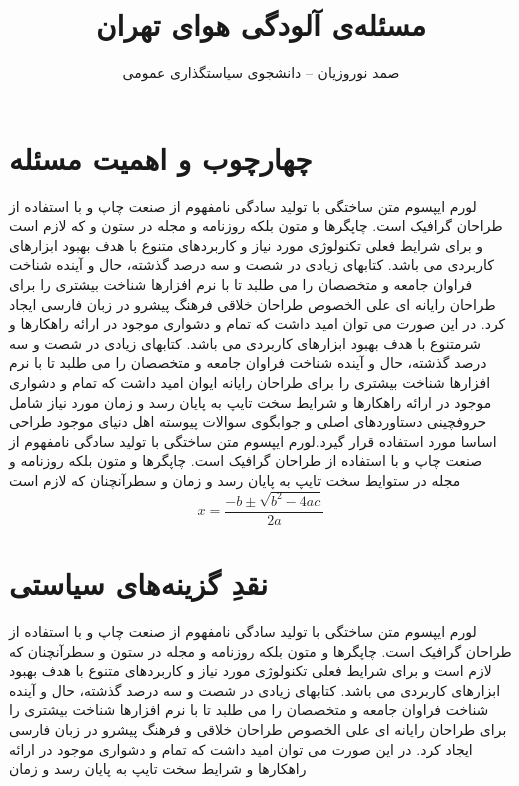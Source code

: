 \documentclass{atu}
\title{مسئله‌ی آلودگی هوای تهران}
\author{صمد نوروزیان -- دانشجوی سیاستگذاری عمومی}
\begin{document}
\maketitle

\section{چهارچوب و اهمیت مسئله}
لورم ایپسوم متن ساختگی با تولید سادگی نامفهوم از صنعت چاپ و با استفاده از طراحان گرافیک است. چاپگرها و متون بلکه روزنامه و مجله در ستون و 
 که لازم است و برای شرایط فعلی تکنولوژی مورد نیاز و کاربردهای متنوع با هدف بهبود ابزارهای کاربردی می باشد. کتابهای زیادی در شصت و سه درصد گذشته، حال و آینده شناخت فراوان جامعه و متخصصان را می طلبد تا با نرم افزارها شناخت بیشتری را برای طراحان رایانه ای علی الخصوص طراحان خلاقی 
فرهنگ پیشرو در زبان فارسی ایجاد کرد. در این صورت می توان امید داشت که تمام و دشواری موجود در ارائه راهکارها و شرمتنوع با هدف بهبود ابزارهای کاربردی می باشد. کتابهای زیادی در شصت و سه درصد گذشته، حال و آینده شناخت فراوان جامعه و متخصصان را می طلبد تا با نرم افزارها شناخت بیشتری را برای طراحان رایانه ایوان امید داشت که تمام و دشواری موجود در ارائه راهکارها و شرایط سخت تایپ به پایان رسد و زمان مورد نیاز شامل حروفچینی دستاوردهای اصلی و جوابگوی سوالات پیوسته اهل دنیای موجود طراحی اساسا مورد استفاده قرار گیرد.لورم ایپسوم متن ساختگی با تولید سادگی نامفهوم از صنعت چاپ و با استفاده از طراحان گرافیک است. چاپگرها و متون بلکه روزنامه و مجله در ستوایط سخت تایپ به پایان رسد و زمان  و سطرآنچنان که لازم است
\begin{equation}
x=\frac{-b\pm\sqrt{b^2-4ac}}{2a}
\end{equation}
\section{نقدِ گزینه‌های سیاستی}
لورم ایپسوم متن ساختگی با تولید سادگی نامفهوم از صنعت چاپ و با استفاده از  طراحان گرافیک است. چاپگرها و متون بلکه روزنامه و مجله در ستون و سطرآنچنان که لازم است و برای شرایط فعلی تکنولوژی مورد نیاز و کاربردهای متنوع با هدف بهبود ابزارهای کاربردی می باشد. کتابهای زیادی در شصت و سه درصد گذشته، حال و آینده شناخت فراوان جامعه و متخصصان را می طلبد تا با نرم افزارها شناخت بیشتری را برای طراحان رایانه ای علی الخصوص طراحان خلاقی و فرهنگ پیشرو در زبان فارسی ایجاد کرد. در این صورت می توان امید داشت که تمام و دشواری موجود در ارائه راهکارها و شرایط سخت تایپ به پایان رسد و زمان 
\cite{Baker02limits}
\end{document}
